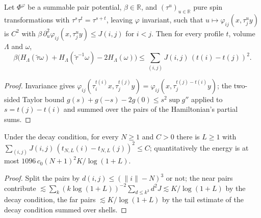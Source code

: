 \begin{lemma}[Georgii (9.28)]
    \label{lem:cs-9-28}
    \leanok

    Let $\Phi^\varphi$ be a summable pair potential, $\beta \in \mathbb R$, and
    $(\tau^u)_{u \in \mathbb R}$ pure spin transformations with $\tau^s\tau^t = \tau^{s+t}$,
    leaving $\varphi$ invariant, such that $u \mapsto \varphi_{ij}(x, \tau^u_j y)$ is $C^2$ with
    $\beta\,\partial_u^2 \varphi_{ij}(x, \tau^u_j y) \leq J(i,j)$ for $i < j$. Then for every
    profile $t$, volume $\Lambda$ and $\omega$,
    \[
        \beta\bigl(H_\Lambda(\tilde\tau\omega) + H_\Lambda(\tilde\tau^{-1}\omega) - 2H_\Lambda(\omega)\bigr)
        \leq \sum_{(i,j)} J(i,j)\,(t(i) - t(j))^2 .
    \]
\end{lemma}
\begin{proof}
    \leanok
    Invariance gives $\varphi_{ij}(\tau^{t(i)}_i x, \tau^{t(j)}_j y) = \varphi_{ij}(x, \tau^{t(j)-t(i)}_j y)$;
    the two-sided Taylor bound $g(s) + g(-s) - 2g(0) \leq s^2 \sup g''$ applied to
    $s = t(j) - t(i)$ and summed over the pairs of the Hamiltonian's partial sums.
\end{proof}

\begin{lemma}[Georgii (9.33)]
    \label{lem:cs-9-33}
    \leanok

    Under the decay condition, for every $N \geq 1$ and $C > 0$ there is $L \geq 1$ with
    $\sum_{(i,j)} J(i,j)\,(t_{N,L}(i) - t_{N,L}(j))^2 \leq C$; quantitatively the energy is at
    most $1096\, c_0 (N+1)^2 K / \log(1+L)$.
\end{lemma}
\begin{proof}
    \leanok
    Split the pairs by $d(i,j) \leq (\|i\| - N)^3$ or not; the near pairs contribute
    $\lesssim \sum_k (k \log(1+L))^{-2} \sum_{d \le k^3} d^2 J \lesssim K/\log(1+L)$ by the decay
    condition, the far pairs $\lesssim K/\log(1+L)$ by the tail estimate of the decay condition
    summed over shells.
\end{proof}

